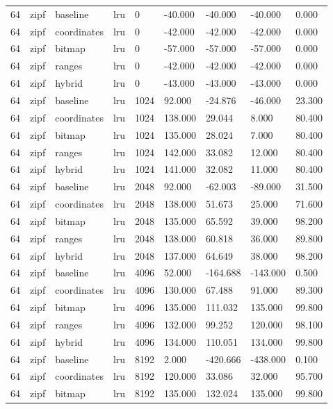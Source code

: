 \begin{tabular}{lllllllll}
64 & zipf & baseline & lru & 0 & -40.000 & -40.000 & -40.000 & 0.000 \\
64 & zipf & coordinates & lru & 0 & -42.000 & -42.000 & -42.000 & 0.000 \\
64 & zipf & bitmap & lru & 0 & -57.000 & -57.000 & -57.000 & 0.000 \\
64 & zipf & ranges & lru & 0 & -42.000 & -42.000 & -42.000 & 0.000 \\
64 & zipf & hybrid & lru & 0 & -43.000 & -43.000 & -43.000 & 0.000 \\
64 & zipf & baseline & lru & 1024 & 92.000 & -24.876 & -46.000 & 23.300 \\
64 & zipf & coordinates & lru & 1024 & 138.000 & 29.044 & 8.000 & 80.400 \\
64 & zipf & bitmap & lru & 1024 & 135.000 & 28.024 & 7.000 & 80.400 \\
64 & zipf & ranges & lru & 1024 & 142.000 & 33.082 & 12.000 & 80.400 \\
64 & zipf & hybrid & lru & 1024 & 141.000 & 32.082 & 11.000 & 80.400 \\
64 & zipf & baseline & lru & 2048 & 92.000 & -62.003 & -89.000 & 31.500 \\
64 & zipf & coordinates & lru & 2048 & 138.000 & 51.673 & 25.000 & 71.600 \\
64 & zipf & bitmap & lru & 2048 & 135.000 & 65.592 & 39.000 & 98.200 \\
64 & zipf & ranges & lru & 2048 & 138.000 & 60.818 & 36.000 & 89.800 \\
64 & zipf & hybrid & lru & 2048 & 137.000 & 64.649 & 38.000 & 98.200 \\
64 & zipf & baseline & lru & 4096 & 52.000 & -164.688 & -143.000 & 0.500 \\
64 & zipf & coordinates & lru & 4096 & 130.000 & 67.488 & 91.000 & 89.300 \\
64 & zipf & bitmap & lru & 4096 & 135.000 & 111.032 & 135.000 & 99.800 \\
64 & zipf & ranges & lru & 4096 & 132.000 & 99.252 & 120.000 & 98.100 \\
64 & zipf & hybrid & lru & 4096 & 134.000 & 110.051 & 134.000 & 99.800 \\
64 & zipf & baseline & lru & 8192 & 2.000 & -420.666 & -438.000 & 0.100 \\
64 & zipf & coordinates & lru & 8192 & 120.000 & 33.086 & 32.000 & 95.700 \\
64 & zipf & bitmap & lru & 8192 & 135.000 & 132.024 & 135.000 & 99.800 \\

\end{tabular}
